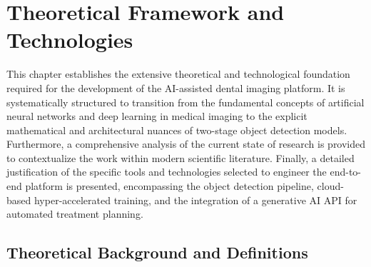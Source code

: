 \chapter{Theoretical Framework and Technologies}
\label{chap:ch3}

\par This chapter establishes the extensive theoretical and technological foundation required for the development of the AI-assisted dental imaging platform. It is systematically structured to transition from the fundamental concepts of artificial neural networks and deep learning in medical imaging to the explicit mathematical and architectural nuances of two-stage object detection models. Furthermore, a comprehensive analysis of the current state of research is provided to contextualize the work within modern scientific literature. Finally, a detailed justification of the specific tools and technologies selected to engineer the end-to-end platform is presented, encompassing the object detection pipeline, cloud-based hyper-accelerated training, and the integration of a generative AI API for automated treatment planning.

\section{Theoretical Background and Definitions}
\label{sec:ch3_theoretical_bg}

